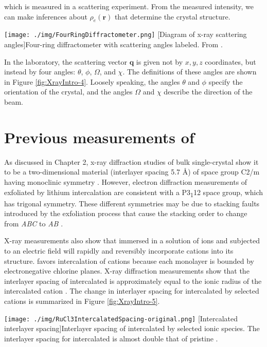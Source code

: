 which is measured in a scattering experiment. From the measured intensity, we can make inferences about $\rho_{e}(\mathbf{r})$ that determine the crystal structure.

\begin{centering}
\texttt{[image: ./img/FourRingDiffractometer.png]}
  \captionsetup{width=0.75\textwidth}
  [Diagram of x-ray scattering angles]{Four-ring diffractometer with scattering angles labeled. From \cite{Clark2007}.} 
  \label{fig:XrayIntro-4}
\end{centering}

In the laboratory, the scattering vector $\mathbf{q}$ is given not by  $x,y,z$ coordinates, but instead by four angles: $\theta$, $\phi$, $\Omega$, and $\chi$. The definitions of these angles are shown in Figure \ref{fig:XrayIntro-4}. Loosely speaking, the angles $\theta$ and $\phi$ specify the orientation of the crystal, and the angles $\Omega$ and $\chi$ describe the direction of the beam.

\section{Previous measurements of \rucl}

As discussed in Chapter 2, x-ray diffraction studies of bulk single-crystal \rucl show it to be a two-dimensional material (interlayer spacing 5.7 \AA) of space group C2/m having monoclinic symmetry \cite{Johnson2015}. However, electron diffraction measurements of \rucl exfoliated by lithium intercalation are consistent with a P3\textsubscript{1}12 space group, which has trigonal symmetry. These different symmetries may be due to stacking faults introduced by the exfoliation process that cause the stacking order to change from \textit{ABC} to \textit{AB} \cite{Gronke2018}.

X-ray measurements also show that \rucl immersed in a solution of ions and subjected to an electric field will rapidly and reversibly incorporate cations into its structure. \rucl favors intercalation of cations because each \rucl monolayer is bounded by electronegative chlorine planes. X-ray diffraction measurements show that the interlayer spacing of intercalated \rucl is approximately equal to the ionic radius of the intercalated cation \cite{Schollhorn1983,Steffen1986}. The change in interlayer spacing for \rucl intercalated by selected cations is summarized in Figure \ref{fig:XrayIntro-5}.

\begin{centering}
\texttt{[image: ./img/RuCl3IntercalatedSpacing-original.png]}
  \captionsetup{width=0.75\textwidth}
  [Intercalated \rucl interlayer spacing]{Interlayer spacing of \rucl intercalated by selected ionic species. The interlayer spacing for intercalated \rucl is almost double that of pristine \ruclnospace .} 
  \label{fig:XrayIntro-5}
\end{centering}

